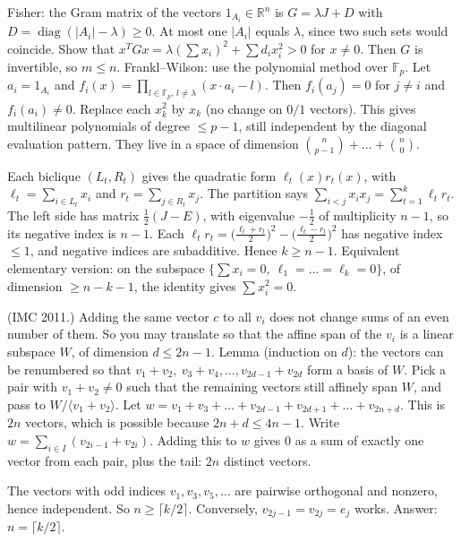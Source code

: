 \documentclass[11pt,a4paper]{article}
\begin{document}

Fisher: the Gram matrix of the vectors \(1_{A_i}\in\mathbb R^n\) is \(G=\lambda J+D\) with \(D=\operatorname{diag}(|A_i|-\lambda)\ge0\). At most one \(|A_i|\) equals \(\lambda\), since two such sets would coincide. Show that \(x^TGx=\lambda(\sum x_i)^2+\sum d_ix_i^2>0\) for \(x\ne0\). Then \(G\) is invertible, so \(m\le n\).
Frankl--Wilson: use the polynomial method over \(\mathbb F_p\). Let \(a_i=1_{A_i}\) and \(f_i(x)=\prod_{l\in\mathbb F_p,\,l\ne\lambda}(x\cdot a_i-l)\). Then \(f_i(a_j)=0\) for \(j\ne i\) and \(f_i(a_i)\ne0\).
Replace each \(x_k^2\) by \(x_k\) (no change on \(0/1\) vectors). This gives multilinear polynomials of degree \(\le p-1\), still independent by the diagonal evaluation pattern. They live in a space of dimension \(\binom n{p-1}+\dots+\binom n0\).

Each biclique \((L_t,R_t)\) gives the quadratic form \(\ell_t(x)r_t(x)\), with \(\ell_t=\sum_{i\in L_t}x_i\) and \(r_t=\sum_{j\in R_t}x_j\). The partition says \(\sum_{i<j}x_ix_j=\sum_{t=1}^k\ell_tr_t\).
The left side has matrix \(\frac12(J-E)\), with eigenvalue \(-\frac12\) of multiplicity \(n-1\), so its negative index is \(n-1\). Each \(\ell_tr_t=\bigl(\frac{\ell_t+r_t}2\bigr)^2-\bigl(\frac{\ell_t-r_t}2\bigr)^2\) has negative index \(\le1\), and negative indices are subadditive. Hence \(k\ge n-1\).
Equivalent elementary version: on the subspace \(\{\sum x_i=0,\ \ell_1=\dots=\ell_k=0\}\), of dimension \(\ge n-k-1\), the identity gives \(\sum x_i^2=0\).

(IMC 2011.) Adding the same vector \(c\) to all \(v_i\) does not change sums of an even number of them. So you may translate so that the affine span of the \(v_i\) is a linear subspace \(W\), of dimension \(d\le2n-1\).
Lemma (induction on \(d\)): the vectors can be renumbered so that \(v_1+v_2,\ v_3+v_4,\dots,v_{2d-1}+v_{2d}\) form a basis of \(W\). Pick a pair with \(v_1+v_2\ne0\) such that the remaining vectors still affinely span \(W\), and pass to \(W/\langle v_1+v_2\rangle\).
Let \(w=v_1+v_3+\dots+v_{2d-1}+v_{2d+1}+\dots+v_{2n+d}\). This is \(2n\) vectors, which is possible because \(2n+d\le4n-1\). Write \(w=\sum_{i\in I}(v_{2i-1}+v_{2i})\). Adding this to \(w\) gives \(0\) as a sum of exactly one vector from each pair, plus the tail: \(2n\) distinct vectors.

The vectors with odd indices \(v_1,v_3,v_5,\dots\) are pairwise orthogonal and nonzero, hence independent.
So \(n\ge\lceil k/2\rceil\). Conversely, \(v_{2j-1}=v_{2j}=e_j\) works. Answer: \(n=\lceil k/2\rceil\).
\end{document}
